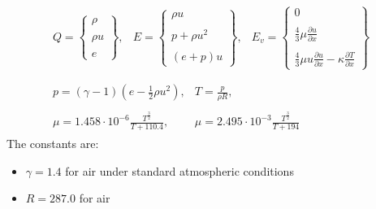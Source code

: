 \documentclass[11pt, a4paper]{article}
\begin{document}
\begin{equation}
    \begin{array}{c}
        \begin{matrix}
            Q=\begin{Bmatrix}
                \rho \\\\
                \rho u \\\\
                e
            \end{Bmatrix}, & E=\begin{Bmatrix}
                \rho u \\\\
                p+\rho u^2 \\\\
                \left(e+p\right)u
            \end{Bmatrix}, & E_v=\begin{Bmatrix}
                0 \\\\
                \displaystyle\frac{4}{3}\mu\frac{\partial u}{\partial x} \\\\
                \displaystyle\frac{4}{3}\mu u\frac{\partial u}{\partial x}-\kappa\frac{\partial T}{\partial x}
            \end{Bmatrix}
        \end{matrix} \\\\
        \begin{matrix}
            \displaystyle p=\left(\gamma-1\right)\left(e-\frac{1}{2}\rho u^2\right), & \displaystyle T=\frac{p}{\rho R}, \\\\
            \displaystyle\mu=1.458\cdot10^{-6}\frac{T^{\frac{3}{2}}}{T+110.4}, & \displaystyle\mu=2.495\cdot10^{-3}\frac{T^{\frac{3}{2}}}{T+194}
        \end{matrix}
    \end{array}
    \label{eq: definitions}
\end{equation}
The constants are:
\begin{itemize}
    \item $\gamma=1.4$ for air under standard atmospheric conditions
    \item $R=287.0$ for air
\end{itemize}
\end{document}
